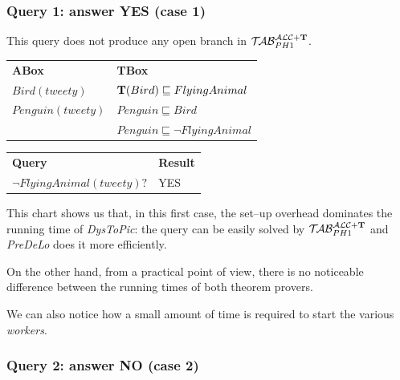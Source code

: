 \documentclass[a4paper, 11pt, oneside]{duthesis}
\newcommand{\tip}{{\bf T}}
\newcommand{\primo}{\mathrel{{\mathcal{T}\!\mathcal{AB}}}_{PH 1}^{\mathcal{ALC}+\mbox{\scriptsize $\tip$}}}
\begin{document}
\subsubsection{Query 1: answer YES (case 1)}

This query does not produce any open branch in $\primo$.\\

\begin{tabular}{ll}
	\textbf{ABox} & \textbf{TBox}\\
	$Bird(tweety)$ & $\tip(Bird) \sqsubseteq FlyingAnimal$\\
	$Penguin(tweety)$ & $Penguin \sqsubseteq Bird$\\
	& $Penguin \sqsubseteq \neg FlyingAnimal$\\[0.5cm]
\end{tabular}

\begin{tabular}{ll}
\textbf{Query} & \textbf{Result}\\
$\neg FlyingAnimal(tweety)?$ & YES\\
\end{tabular}

\begin{figure}[ht]
\begin{bchart}[step=200,max=200,unit=ms,scale=1.4]
    \medskip
    \medskip
    \medskip
    \medskip
\end{bchart}
\caption{}
\end{figure}

This chart shows us that, in this first case, the set--up overhead dominates the running time of \emph{DysToPic}: the query can be easily solved by $\primo$ and \emph{PreDeLo} does it more efficiently.

On the other hand, from a practical point of view, there is no noticeable difference between the running times of both theorem provers.

We can also notice how a small amount of time is required to start the various \emph{workers}.

\newpage

\subsubsection{Query 2: answer NO (case 2)}
\end{document}
